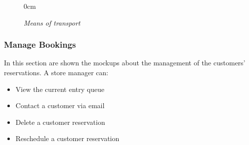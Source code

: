 \documentclass{article}
\begin{document}
\begin{figure}[H]
\begin{adjustwidth} {0cm}{}
			\end{adjustwidth}
			\caption{\emph{Means of transport}}
		\end{figure}
		
		\newpage
	
		\subsubsection{Manage Bookings}
		In this section are shown the mockups about the management of the customers' reservations. A store manager can:
		\begin{itemize}
			\item View the current entry queue
			\item Contact a customer via email
			\item Delete a customer reservation
			\item Reschedule a customer reservation
		\end{itemize}
		\bigskip
		\bigskip
\end{document}
